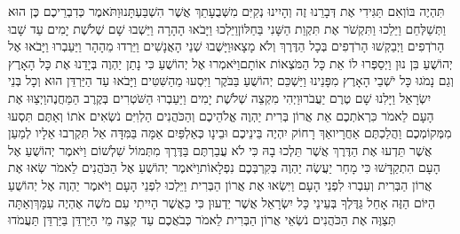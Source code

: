 \documentclass[../main/main.tex]{subfiles}
\begin{document}
\begin{multicols*}{\ncols}
תִּהְיֶה בּוֹ\PreVerseSpace{}וְאִם תַּגִּידִי אֶת דְּבָרֵנוּ זֶה וְהָיִינוּ נְקִיִּם מִשְּׁבֻעָתֵךְ אֲשֶׁר הִשְׁבַּעְתָּנוּ\PreVerseSpace{}וַתֹּאמֶר כְּדִבְרֵיכֶם כֶּן הוּא וַתְּשַׁלְּחֵם וַיֵּלֵכוּ וַתִּקְשֹׁר אֶת תִּקְוַת הַשָּׁנִי בַּחַלּוֹן\PreVerseSpace{}וַיֵּלְכוּ וַיָּבֹאוּ הָהָרָה וַיֵּשְׁבוּ שָׁם שְׁלֹשֶׁת יָמִים עַד שָׁבוּ הָרֹדְפִים וַיְבַקְשׁוּ הָרֹדְפִים בְּכָל הַדֶּרֶךְ וְלֹא מָצָאוּ\PreVerseSpace{}וַיָּשֻׁבוּ שְׁנֵי הָאֲנָשִׁים וַיֵּרְדוּ מֵהָהָר וַיַּעַבְרוּ וַיָּבֹאוּ אֶל יְהוֹשֻׁעַ בִּן נוּן וַיְסַפְּרוּ לוֹ אֵת כָּל הַמֹּצְאוֹת אוֹתָם\PreVerseSpace{}וַיֹּאמְרוּ אֶל יְהוֹשֻׁעַ כִּי נָתַן יַהְוֶה בְּיָדֵנוּ אֶת כָּל הָאָרֶץ וְגַם נָמֹגוּ כָּל יֹשְׁבֵי הָאָרֶץ מִפָּנֵינוּ \ClosedSection{}וַיַּשְׁכֵּם יְהוֹשֻׁעַ בַּבֹּקֶר וַיִּסְעוּ מֵהַשִּׁטִּים וַיָּבֹאוּ עַד הַיַּרְדֵּן הוּא וְכָל בְּנֵי יִשְׂרָאֵל וַיָּלִנוּ שָׁם טֶרֶם יַעֲבֹרוּ\PreVerseSpace{}וַיְהִי מִקְצֵה שְׁלֹשֶׁת יָמִים וַיַּעַבְרוּ הַשֹּׁטְרִים בְּקֶרֶב הַמַּחֲנֶה\PreVerseSpace{}וַיְצַוּוּ אֶת הָעָם לֵאמֹר כִּרְאֹתְכֶם אֵת אֲרוֹן בְּרִית יַהְוֶה אֱלֹהֵיכֶם וְהַכֹּהֲנִים הַלְוִיִּם נֹשְׂאִים אֹתוֹ וְאַתֶּם תִּסְעוּ מִמְּקוֹמְכֶם וַהֲלַכְתֶּם אַחֲרָיו\PreVerseSpace{}אַךְ רָחוֹק יִהְיֶה בֵּינֵיכֶם וּבֵינָו כְּאַלְפַּיִם אַמָּה בַּמִּדָּה אַל תִּקְרְבוּ אֵלָיו לְמַעַן אֲשֶׁר תֵּדְעוּ אֶת הַדֶּרֶךְ אֲשֶׁר תֵּלְכוּ בָהּ כִּי לֹא עֲבַרְתֶּם בַּדֶּרֶךְ מִתְּמוֹל שִׁלְשׁוֹם \ClosedSection{}וַיֹּאמֶר יְהוֹשֻׁעַ אֶל הָעָם הִתְקַדָּשׁוּ כִּי מָחָר יַעֲשֶׂה יַהְוֶה בְּקִרְבְּכֶם נִפְלָאוֹת\PreVerseSpace{}וַיֹּאמֶר יְהוֹשֻׁעַ אֶל הַכֹּהֲנִים לֵאמֹר שְׂאוּ אֶת אֲרוֹן הַבְּרִית וְעִבְרוּ לִפְנֵי הָעָם וַיִּשְׂאוּ אֶת אֲרוֹן הַבְּרִית וַיֵּלְכוּ לִפְנֵי הָעָם \ClosedSection{}וַיֹּאמֶר יַהְוֶה אֶל יְהוֹשֻׁעַ הַיּוֹם הַזֶּה אָחֵל גַּדֶּלְךָ בְּעֵינֵי כָּל יִשְׂרָאֵל אֲשֶׁר יֵדְעוּן כִּי כַּאֲשֶׁר הָיִיתִי עִם מֹשֶׁה אֶהְיֶה עִמָּךְ\PreVerseSpace{}וְאַתָּה תְּצַוֶּה אֶת הַכֹּהֲנִים נֹשְׂאֵי אֲרוֹן הַבְּרִית לֵאמֹר כְּבֹאֲכֶם עַד קְצֵה מֵי הַיַּרְדֵּן בַּיַּרְדֵּן תַּעֲמֹדוּ\OpenSection{}\par

\end{multicols*}
\end{document}
